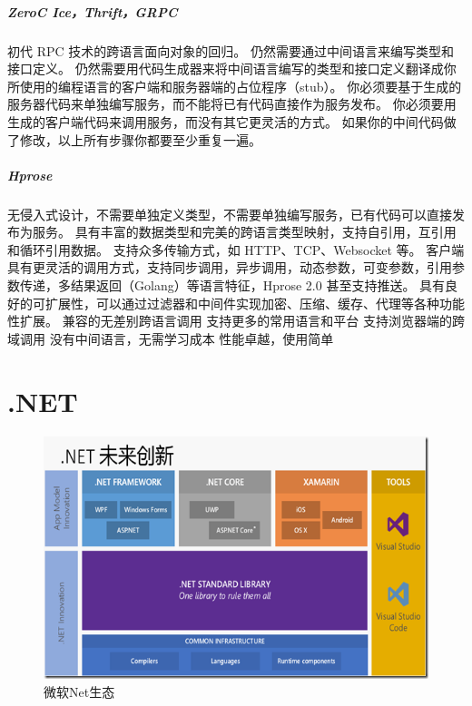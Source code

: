\documentclass{book}
\begin{document}
\paragraph{ZeroC Ice，Thrift，GRPC}

初代 RPC 技术的跨语言面向对象的回归。
仍然需要通过中间语言来编写类型和接口定义。
仍然需要用代码生成器来将中间语言编写的类型和接口定义翻译成你所使用的编程语言的客户端和服务器端的占位程序（stub）。
你必须要基于生成的服务器代码来单独编写服务，而不能将已有代码直接作为服务发布。
你必须要用生成的客户端代码来调用服务，而没有其它更灵活的方式。
如果你的中间代码做了修改，以上所有步骤你都要至少重复一遍。

\paragraph{Hprose}

无侵入式设计，不需要单独定义类型，不需要单独编写服务，已有代码可以直接发布为服务。
具有丰富的数据类型和完美的跨语言类型映射，支持自引用，互引用和循环引用数据。
支持众多传输方式，如 HTTP、TCP、Websocket 等。
客户端具有更灵活的调用方式，支持同步调用，异步调用，动态参数，可变参数，引用参数传递，多结果返回（Golang）等语言特征，Hprose 2.0 甚至支持推送。
具有良好的可扩展性，可以通过过滤器和中间件实现加密、压缩、缓存、代理等各种功能性扩展。
兼容的无差别跨语言调用
支持更多的常用语言和平台
支持浏览器端的跨域调用
没有中间语言，无需学习成本
性能卓越，使用简单

\chapter{.NET}

\clearpage
\mbox{}         
\clearpage

\begin{figure}[htbp]
	\centering
	\includegraphics[scale=0.8]{NetInfrastracture.png}
	\caption{微软Net生态}
	\label{fig:NetInfrastracture}
\end{figure}
\end{document}

